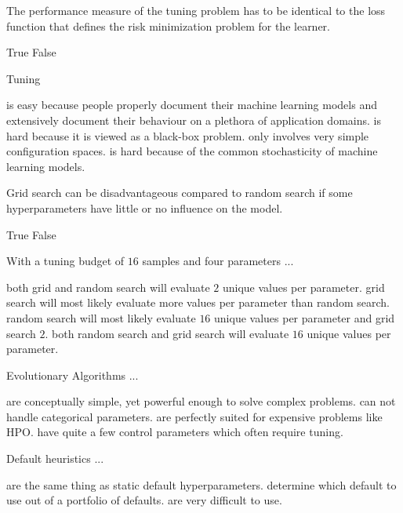 \documentclass{exam}
\begin{document}
\begin{questions}
\question The performance measure of the tuning problem has to be  identical to the loss function that defines the risk minimization problem for the learner.
\begin{choices}
\choice True
\choice False %
\end{choices}

\question Tuning
\begin{choices}
    \choice is easy because people properly document their machine learning models and extensively document their behaviour on a plethora of application domains.
    \choice is hard because it is viewed as a black-box problem. %
    \choice only involves very simple configuration spaces.
    \choice is hard because of the common stochasticity of machine learning models. %
\end{choices}

\question Grid search can be disadvantageous compared to random search if
some hyperparameters have little or no
influence on the model.
\begin{choices}
    \choice True
    \choice False
\end{choices}

\question With a tuning budget of $16$ samples and four parameters ...
\begin{choices}
    \choice both grid and random search will evaluate $2$ unique values per parameter.
    \choice grid search will most likely evaluate more values per parameter than random search.
    \choice random search will most likely evaluate $16$ unique values per parameter and grid search $2$. %
    \choice both random search and grid search will evaluate $16$ unique values per parameter.
\end{choices}

\question Evolutionary Algorithms ...
\begin{choices}
    \choice are conceptually simple, yet powerful enough to solve complex problems. %
    \choice can not handle categorical parameters.
    \choice are perfectly suited for expensive problems like HPO.
    \choice have quite a few control parameters which often require tuning. %
\end{choices}

\question Default heuristics ...
\begin{choices}
    \choice are the same thing as static default hyperparameters.
    \choice determine which default to use out of a portfolio of defaults. %
    \choice are very difficult to use.
\end{choices}
\end{questions}
\end{document}
